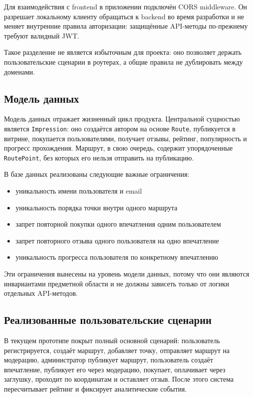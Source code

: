 \documentclass[a4paper,12pt]{extarticle}
\begin{document}
Для взаимодействия с frontend в приложении подключён CORS middleware. Он разрешает локальному клиенту обращаться к backend во время разработки и не меняет внутренние правила авторизации: защищённые API-методы по-прежнему требуют валидный JWT.

Такое разделение не является избыточным для проекта: оно позволяет держать пользовательские сценарии в роутерах, а общие правила не дублировать между доменами.

\subsection{Модель данных}

Модель данных отражает жизненный цикл продукта. Центральной сущностью является \texttt{Impression}: оно создаётся автором на основе \texttt{Route}, публикуется в витрине, покупается пользователями, получает отзывы, рейтинг, популярность и прогресс прохождения. Маршрут, в свою очередь, содержит упорядоченные \texttt{RoutePoint}, без которых его нельзя отправить на публикацию.

В базе данных реализованы следующие важные ограничения:
\begin{itemize}
	\item уникальность имени пользователя и email
	\item уникальность порядка точки внутри одного маршрута
	\item запрет повторной покупки одного впечатления одним пользователем
	\item запрет повторного отзыва одного пользователя на одно впечатление
	\item уникальность прогресса пользователя по конкретному впечатлению
\end{itemize}

Эти ограничения вынесены на уровень модели данных, потому что они являются инвариантами предметной области и не должны зависеть только от логики отдельных API-методов.

\subsection{Реализованные пользовательские сценарии}

В текущем прототипе покрыт полный основной сценарий: пользователь регистрируется, создаёт маршрут, добавляет точку, отправляет маршрут на модерацию, администратор публикует маршрут, пользователь создаёт впечатление, публикует его через модерацию, покупает, оплачивает через заглушку, проходит по координатам и оставляет отзыв. После этого система пересчитывает рейтинг и фиксирует аналитические события.
\end{document}

